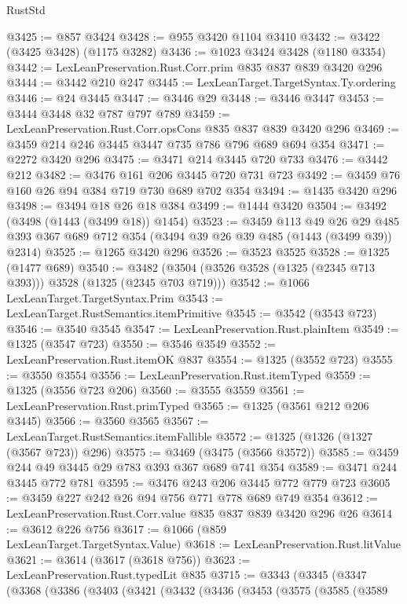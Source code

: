 \begin{lexlean}{RustStd}
\begin{coremodule}
{\begin{coremodule}
{{{{{{{{{@3425 := @857 @3424
@3428 := @955 @3420 @1104 @3410
@3432 := @3422 (@3425 @3428) (@1175 @3282)
@3436 := @1023 @3424 @3428 (@1180 @3354)
@3442 := LexLeanPreservation.Rust.Corr.prim @835 @837 @839 @3420 @296
@3444 := @3442 @210 @247
@3445 := LexLeanTarget.TargetSyntax.Ty.ordering
@3446 := @24 @3445
@3447 := @3446 @29
@3448 := @3446 @3447
@3453 := @3444 @3448 @32 @787 @797 @789
@3459 := LexLeanPreservation.Rust.Corr.opsCons @835 @837 @839 @3420 @296
@3469 := @3459 @214 @246 @3445 @3447 @735 @786 @796 @689 @694 @354
@3471 := @2272 @3420 @296
@3475 := @3471 @214 @3445 @720 @733
@3476 := @3442 @212
@3482 := @3476 @161 @206 @3445 @720 @731 @723
@3492 := @3459 @76 @160 @26 @94 @384 @719 @730 @689 @702 @354
@3494 := @1435 @3420 @296
@3498 := @3494 @18 @26 @18 @384
@3499 := @1444 @3420
@3504 := @3492 (@3498 (@1443 (@3499 @18)) @1454)
@3523 := @3459
    @113
    @49
    @26
    @29
    @485
    @393
    @367
    @689
    @712
    @354
    (@3494 @39 @26 @39 @485 (@1443 (@3499 @39)) @2314)
@3525 := @1265 @3420 @296
@3526 := @3523 @3525
@3528 := @1325 (@1477 @689)
@3540 := @3482 (@3504 (@3526 @3528 (@1325 (@2345 @713 @393))) @3528 (@1325 (@2345 @703 @719)))
@3542 := @1066 LexLeanTarget.TargetSyntax.Prim
@3543 := LexLeanTarget.RustSemantics.itemPrimitive
@3545 := @3542 (@3543 @723)
@3546 := @3540 @3545
@3547 := LexLeanPreservation.Rust.plainItem
@3549 := @1325 (@3547 @723)
@3550 := @3546 @3549
@3552 := LexLeanPreservation.Rust.itemOK @837
@3554 := @1325 (@3552 @723)
@3555 := @3550 @3554
@3556 := LexLeanPreservation.Rust.itemTyped
@3559 := @1325 (@3556 @723 @206)
@3560 := @3555 @3559
@3561 := LexLeanPreservation.Rust.primTyped
@3565 := @1325 (@3561 @212 @206 @3445)
@3566 := @3560 @3565
@3567 := LexLeanTarget.RustSemantics.itemFallible
@3572 := @1325 (@1326 (@1327 (@3567 @723)) @296)
@3575 := @3469 (@3475 (@3566 @3572))
@3585 := @3459 @244 @49 @3445 @29 @783 @393 @367 @689 @741 @354
@3589 := @3471 @244 @3445 @772 @781
@3595 := @3476 @243 @206 @3445 @772 @779 @723
@3605 := @3459 @227 @242 @26 @94 @756 @771 @778 @689 @749 @354
@3612 := LexLeanPreservation.Rust.Corr.value @835 @837 @839 @3420 @296 @26
@3614 := @3612 @226 @756
@3617 := @1066 (@859 LexLeanTarget.TargetSyntax.Value)
@3618 := LexLeanPreservation.Rust.litValue
@3621 := @3614 (@3617 (@3618 @756))
@3623 := LexLeanPreservation.Rust.typedLit @835
@3715 := @3343
    (@3345
      (@3347
        (@3368
          (@3386
            (@3403
              (@3421
                (@3432
                  (@3436
                    (@3453
                      (@3575
                        (@3585
                          (@3589
}}}}}}}}}
\end{coremodule}}
\end{coremodule}
\end{lexlean}

